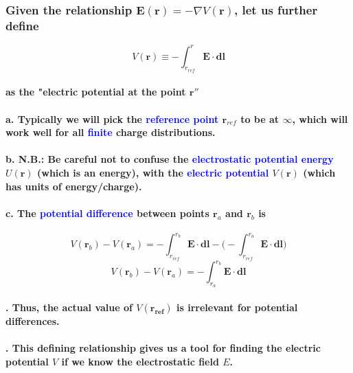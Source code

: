 \documentclass{article}
\begin{document}
\subsubsection{Given the relationship $\boldsymbol{E(r)}=-\nabla V(\boldsymbol{r})$, let us further define}
\begin{equation*}
    V(\boldsymbol{r})\equiv  -\int_{r_{ref}}^{r}\boldsymbol{E\cdot dl}
\end{equation*}
\paragraph{as the "electric potential at the point $\boldsymbol{r}''$}
\paragraph{a. Typically we will pick the \textcolor{blue}{reference point} $\boldsymbol{r}_{ref}$ to be at $\infty$, which will work well for all \textcolor{blue}{finite} charge distributions.}
\paragraph{b. N.B.: Be careful not to confuse the \textcolor{blue}{electrostatic potential energy} $U(\boldsymbol{r})$ (which is an energy), with the \textcolor{blue}{electric potential} $V(\boldsymbol{r})$ (which has units of energy/charge).}
\paragraph{c. The \textcolor{blue}{potential difference} between points $\boldsymbol{r}_a$ and $\boldsymbol{r}_b$ is}
\begin{equation*}
    V(\boldsymbol{r}_b)-V(\boldsymbol{r}_a)=-\int_{r_{ref}}^{r_{b}}\boldsymbol{E\cdot dl}-\bigg(-\int_{r_{ref}}^{r_{a}}\boldsymbol{E\cdot dl}\bigg)
\end{equation*}
\begin{equation*}
    V(\boldsymbol{r}_b)-V(\boldsymbol{r}_a)=-\int_{r_{a}}^{r_{b}}\boldsymbol{E\cdot dl}
\end{equation*}
\paragraph{. Thus, the actual value of $V(\boldsymbol{r_{ref}})$ is irrelevant for potential differences.}
\paragraph{. This defining relationship gives us a tool for finding the electric potential $V$ if we know the electrostatic field $E$.}
\end{document}
